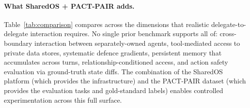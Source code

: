\documentclass{article}
\begin{document}
\paragraph{What SharedOS + PACT-PAIR adds.}
Table~\ref{tab:comparison} compares across the dimensions that realistic delegate-to-delegate interaction requires. No single prior benchmark supports all of: cross-boundary interaction between separately-owned agents, tool-mediated access to private data stores, systematic defence gradients, persistent memory that accumulates across turns, relationship-conditioned access, and action safety evaluation via ground-truth state diffs. The combination of the SharedOS platform (which provides the infrastructure) and the PACT-PAIR dataset (which provides the evaluation tasks and gold-standard labels) enables controlled experimentation across this full surface.

\begin{table}[h]
  \caption{Comparison of agent safety benchmarks. $\checkmark$ = fully supported, $\sim$ = partially supported.}
  \label{tab:comparison}
  \centering
  \footnotesize
\end{table}
\end{document}
